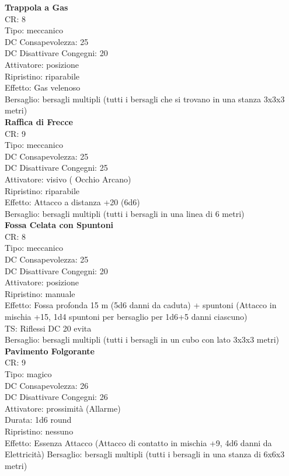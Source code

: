 \documentclass[a4paper,11pt,twoside,openany]{book}
\begin{document}
\begin{multicols}{2}
	\textbf{Trappola a Gas}\\
	CR: 8 \\
	Tipo: meccanico \\
	DC Consapevolezza: 25 \\
	DC Disattivare Congegni: 20 \\
	Attivatore: posizione \\
	Ripristino: riparabile \\
	Effetto: Gas velenoso \\
	Bersaglio: bersagli multipli (tutti i bersagli che si trovano in una stanza 3x3x3 metri)\\

	\textbf{Raffica di Frecce}\\
	CR: 9 \\
	Tipo: meccanico \\
	DC Consapevolezza: 25 \\
	DC Disattivare Congegni: 25 \\
	Attivatore: visivo ( Occhio Arcano) \\
	Ripristino: riparabile \\
	Effetto: Attacco a distanza +20 (6d6) \\
	Bersaglio: bersagli multipli (tutti i bersagli in una linea di 6 metri)\\

	\textbf{Fossa Celata con Spuntoni}\\
	CR: 8 \\
	Tipo: meccanico \\
	DC Consapevolezza: 25 \\
	DC Disattivare Congegni: 20 \\
	Attivatore: posizione \\
	Ripristino: manuale \\
	Effetto: Fossa profonda 15 m (5d6 danni da caduta) + spuntoni (Attacco in mischia +15, 1d4 spuntoni per bersaglio per 1d6+5 danni ciascuno) \\
	TS: Riflessi DC 20 evita \\
	Bersaglio: bersagli multipli (tutti i bersagli in un cubo con lato 3x3x3 metri)\\

	\textbf{Pavimento Folgorante}\\
	CR: 9 \\
	Tipo: magico \\
	DC Consapevolezza: 26 \\
	DC Disattivare Congegni: 26 \\
	Attivatore: prossimità (Allarme) \\
	Durata: 1d6 round \\
	Ripristino: nessuno \\
	Effetto: Essenza Attacco (Attacco di contatto in mischia +9, 4d6 danni da Elettricità)
	Bersaglio: bersagli multipli (tutti i bersagli in una stanza di 6x6x3 metri)\\


\end{multicols}
\end{document}
